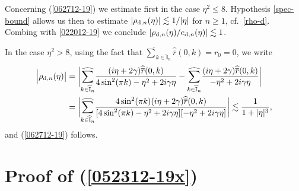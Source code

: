 \documentclass[EJP]{ejpecp} %
\newcommand\T{{\mathbb I}}
\newcommand \ga{\gamma}
\renewcommand{\ge}{\geqslant}
\renewcommand{\le}{\leqslant}
\renewcommand{\hat}{\widehat}
\renewcommand{\bar}{\overline}
\numberwithin{equation}{section}
\begin{document}
Concerning  (\ref{062712-19}) 
we estimate first in the case  $\eta^2\le 8$. 
 Hypothesis
\eqref{spec-bound}  allows us then to estimate
$|\rho_{{\rm d},n}(\eta)|\lesssim 1/|\eta|$ for $n\ge1$, cf.~\eqref{rho-d}. Combing with \eqref{022012-19}
 we conclude $|\rho_{{\rm d},n}(\eta)/e_{{\rm d},n}(\eta)|\lesssim1$. 


In the case  $\eta^2> 8$, using the fact that
$\underset{{k\in \widehat{\T}_n}}{{\hat\sum}}\widehat{\bar
    r}(0,k)=r_0=0$, we  write
\begin{align}
\label{052712-19a}
 \Big|\rho_{{\rm d},n}(\eta)\big|&=\bigg|\underset{{k\in \widehat{\T}_n}}{{\hat\sum}}\frac{(i\eta+2\ga)\widehat{\bar
    r}(0,k)}{4\sin^2(\pi k)-\eta^2+2i\ga \eta}-\underset{{k\in \widehat{\T}_n}}{{\hat\sum}}\frac{(i\eta+2\ga)\widehat{\bar
    r}(0,k)}{-\eta^2+2i\ga \eta}\bigg|\\
&
=\bigg|\underset{{k\in \widehat{\T}_n}}{{\hat\sum}}\frac{4\sin^2(\pi k) (i\eta+2\ga)\widehat{\bar
    r}(0,k)}{[4\sin^2(\pi k)-\eta^2+2i\ga \eta][-\eta^2+2i\ga
  \eta]}\bigg|\lesssim \frac{1}{1+|\eta|^3},\notag
\end{align}
and  (\ref{062712-19}) follows.


\section{Proof of (\ref{052312-19x})}

\end{document}
